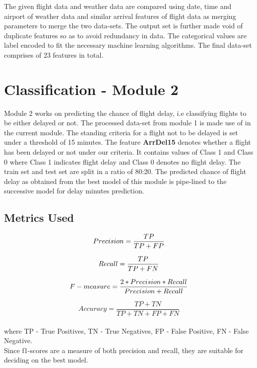 \documentclass{article}
\begin{document}
The given flight data and weather data are compared using date, time and airport of weather data and similar arrival features of flight data as merging parameters to merge the two data-sets. The output set is further made void of duplicate features so as to avoid redundancy in data. The categorical values are label encoded to fit the necessary machine learning algorithms. The final data-set comprises of 23 features in total. 
\section{Classification - Module 2}

Module 2 works on predicting the chance of flight delay, i.e classifying flights to be either delayed or not. The processed data-set from module 1 is made use of in the current module. The standing criteria for a flight not to be delayed is set under a threshold of 15 minutes. The feature \textbf{ArrDel15} denotes whether a flight has been delayed or not under our criteria. It contains values of Class 1 and Class 0 where Class 1 indicates flight delay and Class 0 denotes no flight delay. The train set and test set are split in a ratio of 80:20. The predicted chance of flight delay as obtained from the best model of this module is pipe-lined to the successive model for delay minutes prediction.
\subsection{ Metrics Used }

\begin{equation} \label{eq1}
Precision = \frac{TP}{TP+FP} \\ 
\end{equation}

\begin{equation} \label{eq2}
Recall = \frac{TP}{TP+FN} \\
\end{equation}

\begin{equation} \label{eq3}
F-measure = \frac{2*Precision*Recall}{Precision+Recall} \\
\end{equation}

\begin{equation} \label{eq3}
Accuracy = \frac{TP+TN}{TP+TN+FP+FN}
\end{equation}
\\
where TP - True Positives, TN - True Negatives, FP - False Positive, FN - False Negative.\\
Since f1-scores are a measure of both precision and recall, they are suitable for deciding on the best model.
\end{document}
